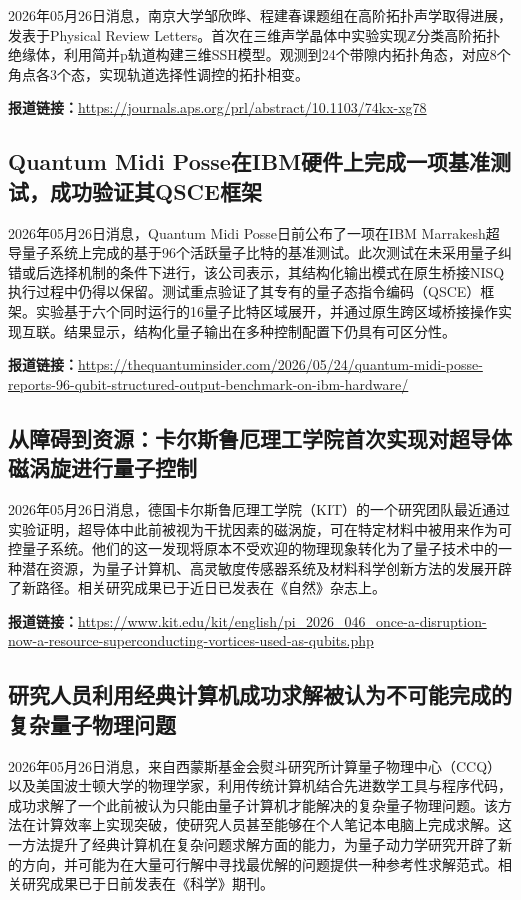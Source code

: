\documentclass[12pt,a4paper]{ctexart}
\begin{document}
2026年05月26日消息，南京大学邹欣晔、程建春课题组在高阶拓扑声学取得进展，发表于Physical Review Letters。首次在三维声学晶体中实验实现ℤ分类高阶拓扑绝缘体，利用简并p轨道构建三维SSH模型。观测到24个带隙内拓扑角态，对应8个角点各3个态，实现轨道选择性调控的拓扑相变。

\noindent\textbf{报道链接：}\url{https://journals.aps.org/prl/abstract/10.1103/74kx-xg78}

\subsection{ Quantum Midi Posse在IBM硬件上完成一项基准测试，成功验证其QSCE框架 }

2026年05月26日消息，Quantum Midi Posse日前公布了一项在IBM Marrakesh超导量子系统上完成的基于96个活跃量子比特的基准测试。此次测试在未采用量子纠错或后选择机制的条件下进行，该公司表示，其结构化输出模式在原生桥接NISQ执行过程中仍得以保留。测试重点验证了其专有的量子态指令编码（QSCE）框架。实验基于六个同时运行的16量子比特区域展开，并通过原生跨区域桥接操作实现互联。结果显示，结构化量子输出在多种控制配置下仍具有可区分性。

\noindent\textbf{报道链接：}\url{https://thequantuminsider.com/2026/05/24/quantum-midi-posse-reports-96-qubit-structured-output-benchmark-on-ibm-hardware/}

\subsection{ 从障碍到资源：卡尔斯鲁厄理工学院首次实现对超导体磁涡旋进行量子控制 }

2026年05月26日消息，德国卡尔斯鲁厄理工学院（KIT）的一个研究团队最近通过实验证明，超导体中此前被视为干扰因素的磁涡旋，可在特定材料中被用来作为可控量子系统。他们的这一发现将原本不受欢迎的物理现象转化为了量子技术中的一种潜在资源，为量子计算机、高灵敏度传感器系统及材料科学创新方法的发展开辟了新路径。相关研究成果已于近日已发表在《自然》杂志上。

\noindent\textbf{报道链接：}\url{https://www.kit.edu/kit/english/pi\_2026\_046\_once-a-disruption-now-a-resource-superconducting-vortices-used-as-qubits.php}

\subsection{ 研究人员利用经典计算机成功求解被认为不可能完成的复杂量子物理问题 }

2026年05月26日消息，来自西蒙斯基金会熨斗研究所计算量子物理中心（CCQ）以及美国波士顿大学的物理学家，利用传统计算机结合先进数学工具与程序代码，成功求解了一个此前被认为只能由量子计算机才能解决的复杂量子物理问题。该方法在计算效率上实现突破，使研究人员甚至能够在个人笔记本电脑上完成求解。这一方法提升了经典计算机在复杂问题求解方面的能力，为量子动力学研究开辟了新的方向，并可能为在大量可行解中寻找最优解的问题提供一种参考性求解范式。相关研究成果已于日前发表在《科学》期刊。
\end{document}

